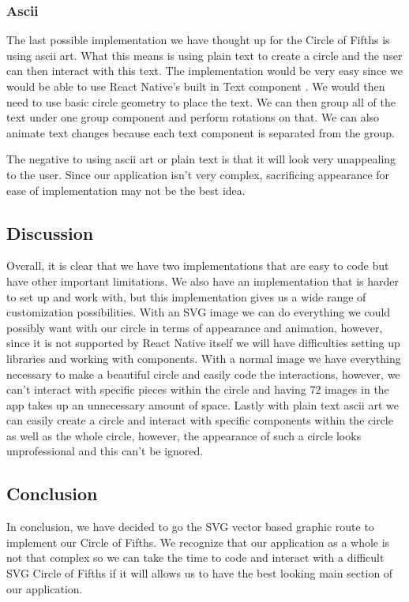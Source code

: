 \documentclass[onecolumn, draftclsnofoot,10pt, compsoc]{IEEEtran}
\begin{document}
\subsubsection{Ascii}

The last possible implementation we have thought up for the Circle of Fifths is using ascii art.
What this means is using plain text to create a circle and the user can then interact with this text.
The implementation would be very easy since we would be able to use React Native's built in Text component \cite{rntext}.
We would then need to use basic circle geometry to place the text.
We can then group all of the text under one group component and perform rotations on that.
We can also animate text changes because each text component is separated from the group.

The negative to using ascii art or plain text is that it will look very unappealing to the user.
Since our application isn't very complex, sacrificing appearance for ease of implementation may not be the best idea.

\subsection{Discussion}

Overall, it is clear that we have two implementations that are easy to code but have other important limitations.
We also have an implementation that is harder to set up and work with, but this implementation gives us a wide range of customization possibilities.
With an SVG image we can do everything we could possibly want with our circle in terms of appearance and animation, however, since it is not supported by React Native itself we will have difficulties setting up libraries and working with components.
With a normal image we have everything necessary to make a beautiful circle and easily code the interactions, however, we can't interact with specific pieces within the circle and having 72 images in the app takes up an unnecessary amount of space.
Lastly with plain text ascii art we can easily create a circle and interact with specific components within the circle as well as the whole circle, however, the appearance of such a circle looks unprofessional and this can't be ignored.

\subsection{Conclusion}

In conclusion, we have decided to go the SVG vector based graphic route to implement our Circle of Fifths.
We recognize that our application as a whole is not that complex so we can take the time to code and interact with a difficult SVG Circle of Fifths if it will allows us to have the best looking main section of our application.
\end{document}
